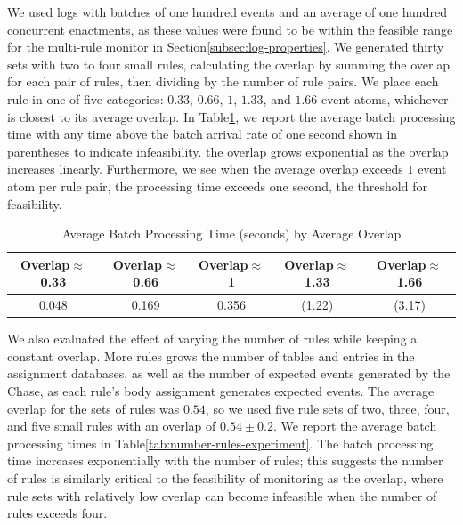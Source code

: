 We used logs with batches of one hundred events
and an average of one hundred concurrent enactments,
as these values were found to be within the feasible range
for the multi-rule monitor
in Section\:\ref{subsec:log-properties}.
We generated thirty sets
with two to four small rules,
calculating the overlap by summing the overlap
for each pair of rules,
then dividing by the number of rule pairs.
We place each rule in one of five categories:
$0.33$, $0.66$, $1$, $1.33$, and $1.66$ event atoms,
whichever is closest to its average overlap.
In Table\:\ref{tab:overlap-experiment}, 
we report the average batch processing time
with any time above the batch arrival rate of one second
shown in parentheses to indicate infeasibility.
the overlap grows exponential as the overlap increases linearly.
Furthermore,
we see when the average overlap
exceeds $1$ event atom per rule pair,
the processing time exceeds one second,
the threshold for feasibility.

\begin{table}[htbp]
  \centering
\begin{tabular}{|c|c|c|c|c|}
\hline
\textbf{Overlap$\approx$0.33}  & \textbf{Overlap$\approx$0.66} & \textbf{Overlap$\approx$1} & \textbf{Overlap$\approx$1.33} & \textbf{Overlap$\approx$1.66} \\\hline\hline
0.048                  & 0.169                 & 0.356              & (1.22)                  & (3.17)                  \\\hline
\end{tabular}
\caption{Average Batch Processing Time (seconds) by Average Overlap}
\label{tab:overlap-experiment}
\end{table}

We also evaluated the effect of varying the number of rules
while keeping a constant overlap.
More rules grows the number of tables and entries
in the assignment databases,
as well as the number of expected events
generated by the {\sf Chase},
as each rule's body assignment generates expected events.
The average overlap for the sets of rules was $0.54$,
so we used five rule sets of two, three, four, and five small rules
with an overlap of $0.54 \pm 0.2$.
We report the average batch processing times
in Table\:\ref{tab:number-rules-experiment}.
The batch processing time increases
exponentially with the number of rules;
this suggests the number of rules
is similarly critical to the feasibility of monitoring
as the overlap,
where rule sets with relatively low overlap
can become infeasible
when the number of rules exceeds four.

